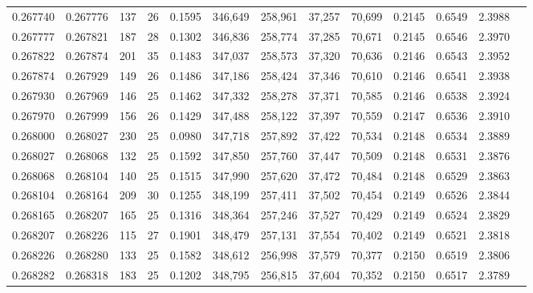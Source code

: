 \begin{tabular}{rrrrrrrrrrrrr}
0.267740 & 0.267776 &   137 &  26 &                                     0.1595 & 346,649 & 258,961 &  37,257 &  70,699 & 0.2145 & 0.6549 & 2.3988 \\
0.267777 & 0.267821 &   187 &  28 &                                     0.1302 & 346,836 & 258,774 &  37,285 &  70,671 & 0.2145 & 0.6546 & 2.3970 \\
0.267822 & 0.267874 &   201 &  35 &                                     0.1483 & 347,037 & 258,573 &  37,320 &  70,636 & 0.2146 & 0.6543 & 2.3952 \\
0.267874 & 0.267929 &   149 &  26 &                                     0.1486 & 347,186 & 258,424 &  37,346 &  70,610 & 0.2146 & 0.6541 & 2.3938 \\
0.267930 & 0.267969 &   146 &  25 &                                     0.1462 & 347,332 & 258,278 &  37,371 &  70,585 & 0.2146 & 0.6538 & 2.3924 \\
0.267970 & 0.267999 &   156 &  26 &                                     0.1429 & 347,488 & 258,122 &  37,397 &  70,559 & 0.2147 & 0.6536 & 2.3910 \\
0.268000 & 0.268027 &   230 &  25 &                                     0.0980 & 347,718 & 257,892 &  37,422 &  70,534 & 0.2148 & 0.6534 & 2.3889 \\
0.268027 & 0.268068 &   132 &  25 &                                     0.1592 & 347,850 & 257,760 &  37,447 &  70,509 & 0.2148 & 0.6531 & 2.3876 \\
0.268068 & 0.268104 &   140 &  25 &                                     0.1515 & 347,990 & 257,620 &  37,472 &  70,484 & 0.2148 & 0.6529 & 2.3863 \\
0.268104 & 0.268164 &   209 &  30 &                                     0.1255 & 348,199 & 257,411 &  37,502 &  70,454 & 0.2149 & 0.6526 & 2.3844 \\
0.268165 & 0.268207 &   165 &  25 &                                     0.1316 & 348,364 & 257,246 &  37,527 &  70,429 & 0.2149 & 0.6524 & 2.3829 \\
0.268207 & 0.268226 &   115 &  27 &                                     0.1901 & 348,479 & 257,131 &  37,554 &  70,402 & 0.2149 & 0.6521 & 2.3818 \\
0.268226 & 0.268280 &   133 &  25 &                                     0.1582 & 348,612 & 256,998 &  37,579 &  70,377 & 0.2150 & 0.6519 & 2.3806 \\
0.268282 & 0.268318 &   183 &  25 &                                     0.1202 & 348,795 & 256,815 &  37,604 &  70,352 & 0.2150 & 0.6517 & 2.3789 \\

\end{tabular}

